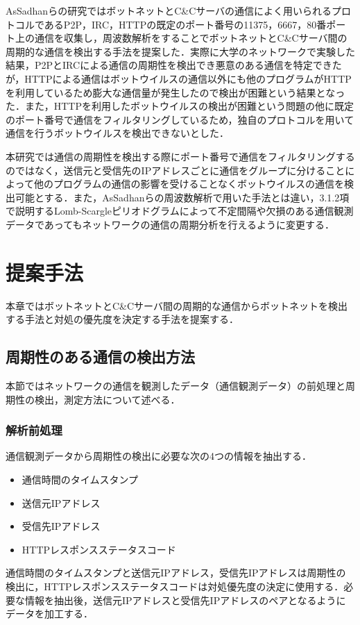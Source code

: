 \documentclass[twocolumn]{ltjsarticle}
\begin{document}
AsSadhanらの研究\cite{assadhan2018analysis}ではボットネットとC\&Cサーバの通信によく用いられるプロトコルであるP2P，IRC，HTTPの既定のポート番号の11375，6667，80番ポート上の通信を収集し，周波数解析をすることでボットネットとC\&Cサーバ間の周期的な通信を検出する手法を提案した．実際に大学のネットワークで実験した結果，P2PとIRCによる通信の周期性を検出でき悪意のある通信を特定できたが，HTTPによる通信はボットウイルスの通信以外にも他のプログラムがHTTPを利用しているため膨大な通信量が発生したので検出が困難という結果となった．また，HTTPを利用したボットウイルスの検出が困難という問題の他に既定のポート番号で通信をフィルタリングしているため，独自のプロトコルを用いて通信を行うボットウイルスを検出できないとした．

本研究では通信の周期性を検出する際にポート番号で通信をフィルタリングするのではなく，送信元と受信先のIPアドレスごとに通信をグループに分けることによって他のプログラムの通信の影響を受けることなくボットウイルスの通信を検出可能とする．また，AsSadhanらの周波数解析で用いた手法とは違い，3.1.2項で説明するLomb-Scargleピリオドグラムによって不定間隔や欠損のある通信観測データであってもネットワークの通信の周期分析を行えるように変更する．

\section{提案手法}
本章ではボットネットとC\&Cサーバ間の周期的な通信からボットネットを検出する手法と対処の優先度を決定する手法を提案する．

\subsection{周期性のある通信の検出方法}
本節ではネットワークの通信を観測したデータ（通信観測データ）の前処理と周期性の検出，測定方法について述べる．

\subsubsection{解析前処理}
通信観測データから周期性の検出に必要な次の4つの情報を抽出する．
\begin{itemize}
  \item 通信時間のタイムスタンプ
  \item 送信元IPアドレス
  \item 受信先IPアドレス
  \item HTTPレスポンスステータスコード
\end{itemize}
通信時間のタイムスタンプと送信元IPアドレス，受信先IPアドレスは周期性の検出に，HTTPレスポンスステータスコードは対処優先度の決定に使用する．必要な情報を抽出後，送信元IPアドレスと受信先IPアドレスのペアとなるようにデータを加工する．
\end{document}
